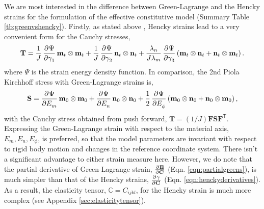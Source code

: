     

	We are most interested in the difference between Green-Lagrange and the Hencky strains for the formulation of the effective constitutive model (Summary Table \ref{tb:greenvshencky}). Firstly, as stated above , Hencky strains lead to a very convenient form for the Cauchy stresses,
\begin{equation}\label{eqn:cauchystressform}
\mathbf{T}	= \frac{1}{J} \dpd{\Psi}{\gamma_1} \mathbf{m}_t\otimes\mathbf{m}_t 
			+ \frac{1}{J} \dpd{\Psi}{\gamma_2} \mathbf{n}_t\otimes\mathbf{n}_t 
			+ \frac{\lambda_n}{J\lambda_m} \dpd{\Psi}{\gamma_3} \left(\mathbf{m}_t\otimes\mathbf{n}_t + \mathbf{n}_t\otimes\mathbf{m}_t \right).
\end{equation}
    where $\Psi$ is the strain energy density function. In comparison, the 2nd Piola Kirchhoff stress with Green-Lagrange strains is,
\begin{equation} \label{eqn:2ndpkstressform}
\mathbf{S} = \dpd{\Psi}{E_m}\mathbf{m}_0\otimes\mathbf{m}_0
+ \dpd{\Psi}{E_n}\mathbf{n}_0\otimes\mathbf{n}_0 
+ \frac{1}{2}\dpd{\Psi}{E_{\phi}}\left(\mathbf{m}_0\otimes\mathbf{n}_0 + \mathbf{n}_0\otimes\mathbf{m}_0\right),
\end{equation}
    with the Cauchy stress obtained from push forward, $\mathbf{T} = (1/J) \mathbf{F}\mathbf{S}\mathbf{F}^\mathsf{T}$. Expressing the Green-Lagrange strain with respect to the material axis, ${E_m, E_n, E_\phi}$, is preferred, so that the model parameters are invariant with respect to rigid body motion and changes in the reference coordinate system. There isn't a significant advantage to either strain measure here. However, we do note that the partial derivative of Green-Lagrange strain, $\pd{\mathbf{E}}{\mathbf{C}}$ (Eqn. \ref{eqn:partialgreens}), is much simpler than that of the Hencky strains, $\pd{\gamma}{\mathbf{C}}$ (Eqn. \ref{eqn:henckyderivatives}). As a result, the elasticity tensor, $\mathbb{C} = C_{ijkl}$, for the Hencky strain is much more complex (see Appendix \ref{sec:elasticitytensor}). 

